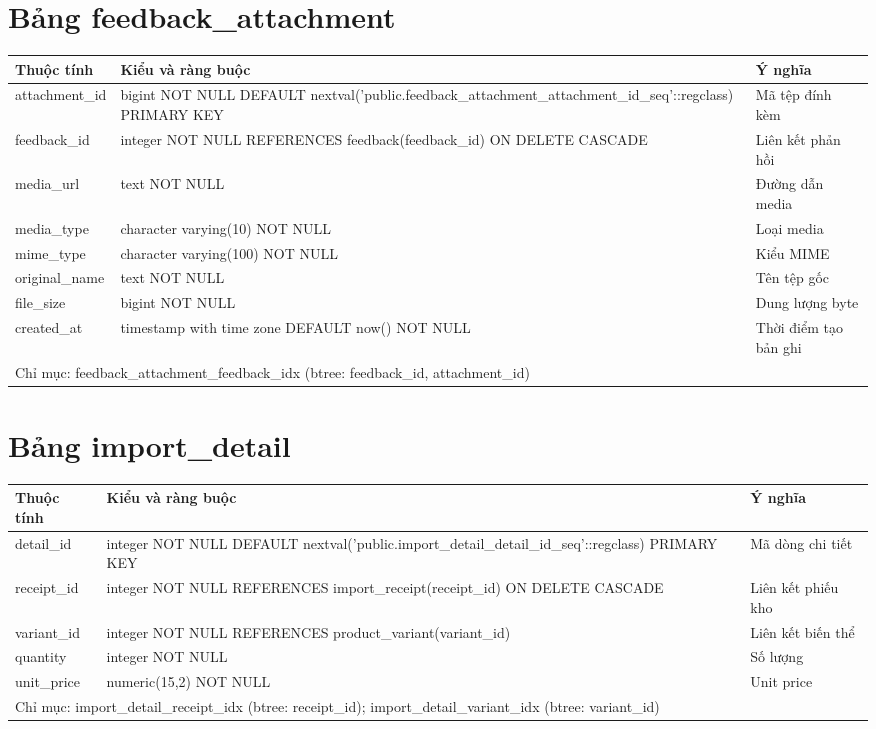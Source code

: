 \section{Bảng feedback\_attachment}
\begin{longtable}{|p{}|p{}|p{}|}\hline
\textbf{Thuộc tính}&\textbf{Kiểu và ràng buộc}&\textbf{Ý nghĩa}\\\hline\endhead
attachment\_id & bigint NOT NULL DEFAULT nextval('public.feedback\_attachment\_attachment\_id\_seq'::regclass) PRIMARY KEY & Mã tệp đính kèm\\\hline
feedback\_id & integer NOT NULL REFERENCES feedback(feedback\_id) ON DELETE CASCADE & Liên kết phản hồi\\\hline
media\_url & text NOT NULL & Đường dẫn media\\\hline
media\_type & character varying(10) NOT NULL & Loại media\\\hline
mime\_type & character varying(100) NOT NULL & Kiểu MIME\\\hline
original\_name & text NOT NULL & Tên tệp gốc\\\hline
file\_size & bigint NOT NULL & Dung lượng byte\\\hline
created\_at & timestamp with time zone DEFAULT now() NOT NULL & Thời điểm tạo bản ghi\\\hline
\multicolumn{3}{|p{0.93\textwidth}|}{Chỉ mục: feedback\_attachment\_feedback\_idx (btree: feedback\_id, attachment\_id)}\\\hline
\end{longtable}
\normalsize
\section{Bảng import\_detail}
\begin{longtable}{|p{}|p{}|p{}|}\hline
\textbf{Thuộc tính}&\textbf{Kiểu và ràng buộc}&\textbf{Ý nghĩa}\\\hline\endhead
detail\_id & integer NOT NULL DEFAULT nextval('public.import\_detail\_detail\_id\_seq'::regclass) PRIMARY KEY & Mã dòng chi tiết\\\hline
receipt\_id & integer NOT NULL REFERENCES import\_receipt(receipt\_id) ON DELETE CASCADE & Liên kết phiếu kho\\\hline
variant\_id & integer NOT NULL REFERENCES product\_variant(variant\_id) & Liên kết biến thể\\\hline
quantity & integer NOT NULL & Số lượng\\\hline
unit\_price & numeric(15,2) NOT NULL & Unit price\\\hline
\multicolumn{3}{|p{0.93\textwidth}|}{Chỉ mục: import\_detail\_receipt\_idx (btree: receipt\_id); import\_detail\_variant\_idx (btree: variant\_id)}\\\hline
\end{longtable}
\normalsize
